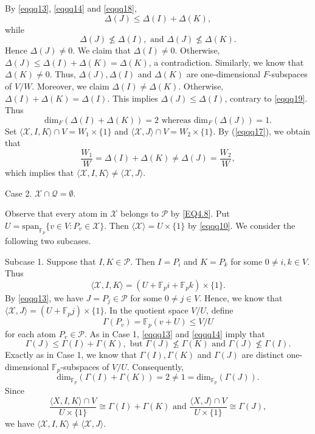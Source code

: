 \documentclass[12pt]{article}
\begin{document}
By \eqref{eqqq13}, \eqref{eqqq14} and \eqref{eqqq18}, $$\Delta(J)\leq \Delta(I)+\Delta(K),$$ while 
\begin{equation}\label{eqqq19}
\Delta(J)\nleq \Delta(I), \mbox{ and }\Delta(J)\nleq \Delta(K).
\end{equation}
Hence $\Delta(J)\neq 0$. We claim that $\Delta(I)\neq 0$. 
Otherwise, $\Delta(J) \leq \Delta(I)+\Delta(K)=\Delta(K)$, 
a contradiction. Similarly, we know that $\Delta(K)\neq 0$.
Thus, $\Delta(J),\Delta(I)$ and $\Delta(K)$ are one-dimensional 
$F$-subspaces of $V/W$. Moreover, we claim $\Delta(I)\neq\Delta(K)$. 
Otherwise, $\Delta(I)+\Delta(K)=\Delta(I)$. This implies $\Delta(J)\leq \Delta(I)$, contrary to \eqref{eqqq19}. 
Thus
$$\mbox{dim}_{F}(\Delta(I)+\Delta(K))=2 \mbox{ whereas } \mbox{dim}_{F}(\Delta(J))=1.$$
Set $\langle \mathcal{X},I,K\rangle\cap V=W_1\times\{1\}$ and 
$\langle \mathcal{X},J\rangle\cap V=W_2\times\{1\}$. 
By (\ref{eqqq17}), we obtain that 
$$\frac{W_1}{W}=\Delta(I)+\Delta(K)\neq \Delta(J)=\frac{W_2}{W},$$ which implies that $\langle \mathcal{X},I,K\rangle\neq \langle \mathcal{X},J\rangle$.

Case 2. $\mathcal{X}\cap \mathcal{Q}=\emptyset$. 

Observe that every atom in $\mathcal{X}$ belongs to $\mathcal{P}$ by \eqref{EQ4.8}. 
Put $U=\mbox{span}_{\mathbb{F}_p}\{v\in V: P_v\in \mathcal{X}\}$. 
Then $\langle \mathcal{X}\rangle=U\times\{1\}$ by \eqref{eqqq10}. We consider the following two subcases.

Subcase 1. Suppose that $I, K\in \mathcal{P}$. Then $I=P_i$ and $K=P_k$ for some $0\neq i,k\in V$. 
Thus $$\langle \mathcal{X},I,K\rangle=(U+\mathbb{F}_{p}i+\mathbb{F}_{p}k)\times \{1\}.$$
By \eqref{eqqq13}, we have $J=P_j\in \mathcal{P}$ for some $0\neq j\in V$.
Hence, we know that $\langle \mathcal{X},J\rangle=(U+\mathbb{F}_{p}j)\times \{1\}$. In the quotient 
space $V/U$, define $$\varGamma(P_v)=\mathbb{F}_{p}(v+U)\leq V/U$$ 
for each atom  $P_v\in \mathcal{P}$. 
As in Case 1, \eqref{eqqq13} and \eqref{eqqq14} imply that
$$\varGamma(J)\leq \varGamma(I)+\varGamma(K), 
\mbox{ but }\varGamma(J)\nleq \varGamma(K) \mbox{ and }\varGamma(J)\nleq \varGamma(I).$$
Exactly as in Case 1, we know that $\varGamma(I), \varGamma(K)$ and $\varGamma(J)$ 
are distinct one-dimensional $\mathbb{F}_{p}$-subspaces of $V/U$. Consequently, $$\mbox{dim}_{\mathbb{F}_{p}}(\varGamma(I)+\varGamma(K))=2 \neq 1=\mbox{dim}_{\mathbb{F}_{p}}(\varGamma(J)).$$
Since $$\frac{\langle X,I,K\rangle\cap V}{U\times\{1\}}\cong\Gamma(I)+\Gamma(K) \mbox{ and }
\frac{\langle X,J\rangle\cap V}{U\times\{1\}}\cong\Gamma(J),$$ we have $\langle \mathcal{X},I,K\rangle\neq \langle \mathcal{X},J\rangle$.
\end{document}
